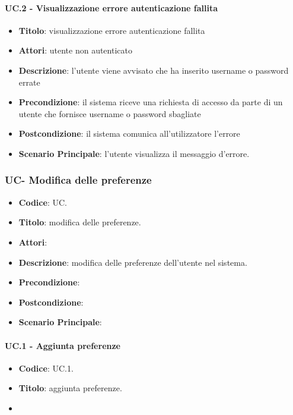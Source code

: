 	\paragraph{UC\theuccount.2 - Visualizzazione errore autenticazione fallita}
		\begin{itemize}
			\item \textbf{Titolo}: visualizzazione errore autenticazione fallita
			\item \textbf{Attori}: utente non autenticato
			\item \textbf{Descrizione}: l'utente viene avvisato che ha inserito username o password errate
			\item \textbf{Precondizione}: il sistema riceve una richiesta di accesso da parte di un utente che
			fornisce username o password sbagliate
			\item \textbf{Postcondizione}: il sistema comunica all'utilizzatore l'errore
			\item \textbf{Scenario Principale}: l'utente visualizza il messaggio d'errore.
		\end{itemize}


\subsubsection{UC\theuccount - Modifica delle preferenze}
	\begin{itemize}
		\item \textbf{Codice}: UC\theuccount.
		\item \textbf{Titolo}: modifica delle preferenze.
		\item \textbf{Attori}: 
		\item \textbf{Descrizione}: modifica delle preferenze dell'utente nel sistema.
		\item \textbf{Precondizione}: 
		\item \textbf{Postcondizione}: 
		\item \textbf{Scenario Principale}:
	\end{itemize}



	\paragraph{UC\theuccount.1 - Aggiunta preferenze}
	\begin{itemize}
		\item \textbf{Codice}: UC\theuccount.1.
		\item \textbf{Titolo}: aggiunta preferenze.
		\item 
	\end{itemize}
	

